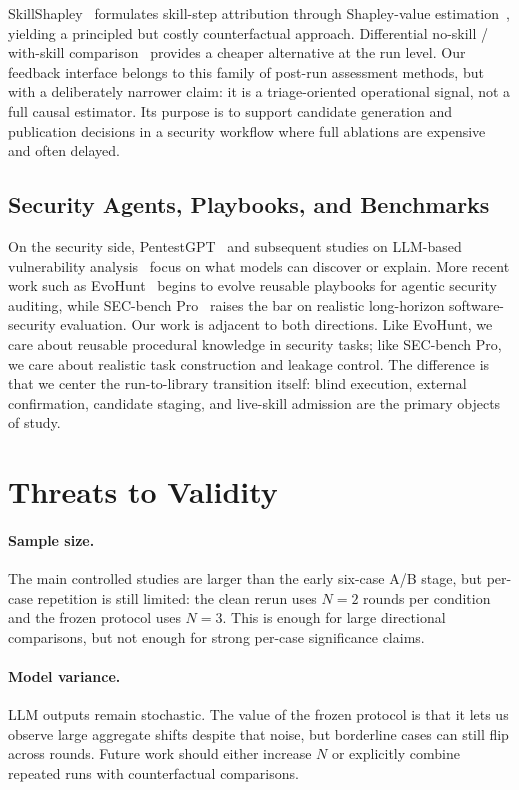 ﻿\documentclass[preprint,12pt]{elsarticle}
\begin{document}
SkillShapley~\cite{skillshapley} formulates skill-step attribution through
Shapley-value estimation~\cite{shapley}, yielding a principled but costly
counterfactual approach.  Differential no-skill / with-skill
comparison~\cite{skillharmful} provides a cheaper alternative at the run
level.  Our feedback interface belongs to this family of post-run
assessment methods, but with a deliberately narrower claim: it is a
triage-oriented operational signal, not a full causal estimator.  Its
purpose is to support candidate generation and publication decisions in a
security workflow where full ablations are expensive and often delayed.

\subsection{Security Agents, Playbooks, and Benchmarks}

On the security side, PentestGPT~\cite{pentestgpt} and subsequent studies
on LLM-based vulnerability analysis~\cite{gpt4vuln,aslr} focus on what
models can discover or explain.  More recent work such as
EvoHunt~\cite{evohunt} begins to evolve reusable playbooks for agentic
security auditing, while SEC-bench Pro~\cite{secbenchpro} raises the bar on
realistic long-horizon software-security evaluation.  Our work is adjacent
to both directions.  Like EvoHunt, we care about reusable procedural
knowledge in security tasks; like SEC-bench Pro, we care about realistic
task construction and leakage control.  The difference is that we center
the run-to-library transition itself: blind execution, external
confirmation, candidate staging, and live-skill admission are the primary
objects of study.

\section{Threats to Validity}
\label{sec:threats}

\paragraph{Sample size.}
The main controlled studies are larger than the early six-case A/B stage,
but per-case repetition is still limited: the clean rerun uses $N=2$ rounds
per condition and the frozen protocol uses $N=3$.  This is enough for
large directional comparisons, but not enough for strong per-case
significance claims.

\paragraph{Model variance.}
LLM outputs remain stochastic.  The value of the frozen protocol is that it
lets us observe large aggregate shifts despite that noise, but borderline
cases can still flip across rounds.  Future work should either increase $N$
or explicitly combine repeated runs with counterfactual comparisons.
\end{document}
